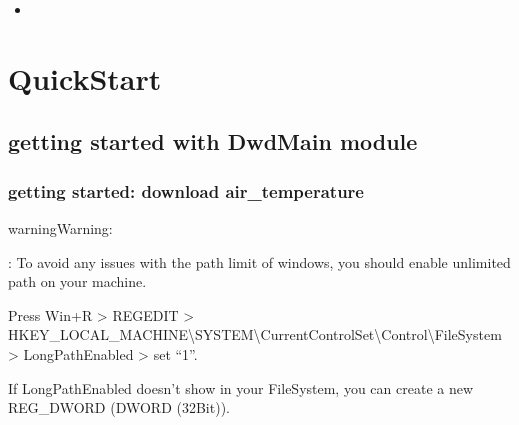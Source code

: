 \documentclass[letterpaper,10pt,english]{sphinxmanual}
\begin{document}
\begin{sphinxShadowBox}
\begin{itemize}
\begin{itemize}
\begin{itemize}
\item {} 
\sphinxAtStartPar
{}\label{\detokenize{quick_start:id8}}{\hyperref[\detokenize{quick_start:getting-started-data-plots-and-calculations}]{}}

\end{itemize}

\end{itemize}

\item {} 
\sphinxAtStartPar
{}\label{\detokenize{quick_start:id9}}{\hyperref[\detokenize{quick_start:indices-and-tables}]{}}

\end{itemize}
\end{sphinxShadowBox}


\chapter{Quick\sphinxhyphen{}Start}
\label{\detokenize{quick_start:quick-start}}\label{\detokenize{quick_start::doc}}

\section{getting started with DwdMain module}
\label{\detokenize{quick_start:getting-started-with-dwdmain-module}}

\subsection{getting started: download air\_temperature}
\label{\detokenize{quick_start:getting-started-download-air-temperature}}
\begin{sphinxadmonition}{warning}{Warning:}
\begin{DUlineblock}{0em}
\item[] : To avoid any issues with the path limit of windows, you should enable unlimited path on your machine.
\item[] Press Win+R \sphinxhyphen{}\textgreater{} REGEDIT \sphinxhyphen{}\textgreater{} HKEY\_LOCAL\_MACHINE\textbackslash{}SYSTEM\textbackslash{}CurrentControlSet\textbackslash{}Control\textbackslash{}FileSystem \sphinxhyphen{}\textgreater{} LongPathEnabled \sphinxhyphen{}\textgreater{} set “1”.
\item[] If LongPathEnabled doesn’t show in your FileSystem, you can create a new REG\_DWORD (DWORD (32\sphinxhyphen{}Bit)).
\end{DUlineblock}
\end{sphinxadmonition}
\end{document}

